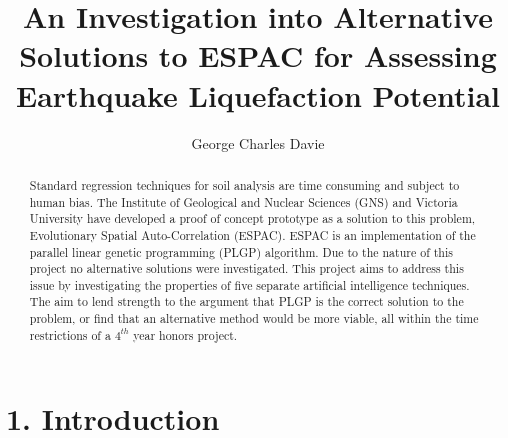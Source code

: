 \documentclass[11pt, a4paper, twoside, openright]{report}
\title{An Investigation into Alternative Solutions to ESPAC for Assessing Earthquake Liquefaction Potential}
\author{George Charles Davie}
\date{}
\begin{document}
\frontmatter


\begin{abstract}
   Standard regression techniques for soil analysis are time consuming and subject to human bias. The Institute of Geological and Nuclear Sciences (GNS) and
Victoria University have developed a proof of concept prototype as a solution to this problem, Evolutionary Spatial Auto-Correlation (ESPAC). ESPAC is an implementation of the parallel linear genetic programming (PLGP) algorithm. Due to the nature of this project no alternative solutions were investigated. This project aims to address this issue by investigating the properties of five separate artificial intelligence techniques. The aim to lend strength to the argument that PLGP is the correct solution to the problem, or find that an alternative method would be more viable, all within the time restrictions of a $4^{th}$ year honors project.
\end{abstract}


\maketitle




\mainmatter


\section*{1. Introduction}
\end{document}
